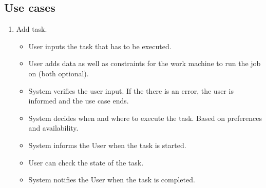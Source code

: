 \subsection{Use cases}
\begin{enumerate}
  \item Add task.
  \begin{itemize}
    \item User inputs the task that has to be executed.
    \item User adds data as well as constraints for the work machine to run the job on (both optional).
    \item System verifies the user input.
    If the there is an error, the user is informed and the use case ends.
    \item System decides when and where to execute the task.
    Based on preferences and availability.
    \item System informs the User when the task is started.
    \item User can check the state of the task.
    \item System notifies the User when the task is completed.
  \end{itemize}
\end{enumerate}